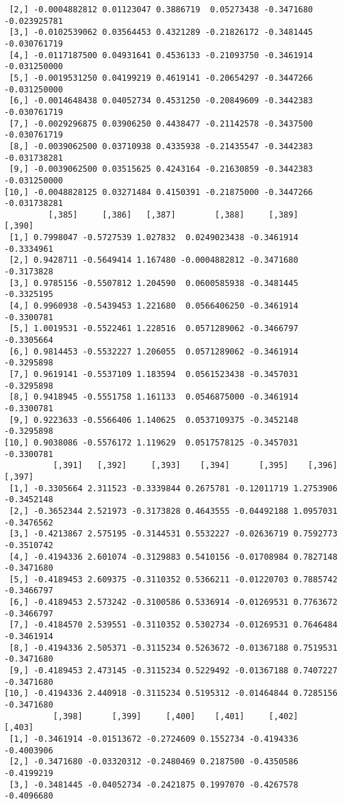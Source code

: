 \documentclass[
  letterpaper,
  DIV=11,
  numbers=noendperiod]{scrreprt}
\begin{document}
\begin{verbatim}
 [2,] -0.0004882812 0.01123047 0.3886719  0.05273438 -0.3471680 -0.023925781
 [3,] -0.0102539062 0.03564453 0.4321289 -0.21826172 -0.3481445 -0.030761719
 [4,] -0.0117187500 0.04931641 0.4536133 -0.21093750 -0.3461914 -0.031250000
 [5,] -0.0019531250 0.04199219 0.4619141 -0.20654297 -0.3447266 -0.031250000
 [6,] -0.0014648438 0.04052734 0.4531250 -0.20849609 -0.3442383 -0.030761719
 [7,] -0.0029296875 0.03906250 0.4438477 -0.21142578 -0.3437500 -0.030761719
 [8,] -0.0039062500 0.03710938 0.4335938 -0.21435547 -0.3442383 -0.031738281
 [9,] -0.0039062500 0.03515625 0.4243164 -0.21630859 -0.3442383 -0.031250000
[10,] -0.0048828125 0.03271484 0.4150391 -0.21875000 -0.3447266 -0.031738281
         [,385]     [,386]   [,387]        [,388]     [,389]     [,390]
 [1,] 0.7998047 -0.5727539 1.027832  0.0249023438 -0.3461914 -0.3334961
 [2,] 0.9428711 -0.5649414 1.167480 -0.0004882812 -0.3471680 -0.3173828
 [3,] 0.9785156 -0.5507812 1.204590  0.0600585938 -0.3481445 -0.3325195
 [4,] 0.9960938 -0.5439453 1.221680  0.0566406250 -0.3461914 -0.3300781
 [5,] 1.0019531 -0.5522461 1.228516  0.0571289062 -0.3466797 -0.3305664
 [6,] 0.9814453 -0.5532227 1.206055  0.0571289062 -0.3461914 -0.3295898
 [7,] 0.9619141 -0.5537109 1.183594  0.0561523438 -0.3457031 -0.3295898
 [8,] 0.9418945 -0.5551758 1.161133  0.0546875000 -0.3461914 -0.3300781
 [9,] 0.9223633 -0.5566406 1.140625  0.0537109375 -0.3452148 -0.3295898
[10,] 0.9038086 -0.5576172 1.119629  0.0517578125 -0.3457031 -0.3300781
          [,391]   [,392]     [,393]    [,394]      [,395]    [,396]     [,397]
 [1,] -0.3305664 2.311523 -0.3339844 0.2675781 -0.12011719 1.2753906 -0.3452148
 [2,] -0.3652344 2.521973 -0.3173828 0.4643555 -0.04492188 1.0957031 -0.3476562
 [3,] -0.4213867 2.575195 -0.3144531 0.5532227 -0.02636719 0.7592773 -0.3510742
 [4,] -0.4194336 2.601074 -0.3129883 0.5410156 -0.01708984 0.7827148 -0.3471680
 [5,] -0.4189453 2.609375 -0.3110352 0.5366211 -0.01220703 0.7885742 -0.3466797
 [6,] -0.4189453 2.573242 -0.3100586 0.5336914 -0.01269531 0.7763672 -0.3466797
 [7,] -0.4184570 2.539551 -0.3110352 0.5302734 -0.01269531 0.7646484 -0.3461914
 [8,] -0.4194336 2.505371 -0.3115234 0.5263672 -0.01367188 0.7519531 -0.3471680
 [9,] -0.4189453 2.473145 -0.3115234 0.5229492 -0.01367188 0.7407227 -0.3471680
[10,] -0.4194336 2.440918 -0.3115234 0.5195312 -0.01464844 0.7285156 -0.3471680
          [,398]      [,399]     [,400]    [,401]     [,402]     [,403]
 [1,] -0.3461914 -0.01513672 -0.2724609 0.1552734 -0.4194336 -0.4003906
 [2,] -0.3471680 -0.03320312 -0.2480469 0.2187500 -0.4350586 -0.4199219
 [3,] -0.3481445 -0.04052734 -0.2421875 0.1997070 -0.4267578 -0.4096680

\end{verbatim}
\end{document}
